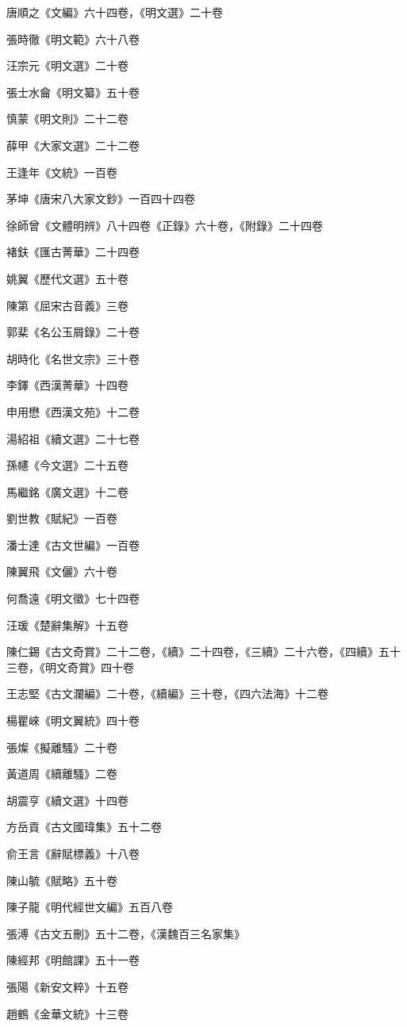 唐順之《文編》六十四卷，《明文選》二十卷

張時徹《明文範》六十八卷

汪宗元《明文選》二十卷

張士水龠《明文纂》五十卷

慎蒙《明文則》二十二卷

薛甲《大家文選》二十二卷

王逢年《文統》一百卷

茅坤《唐宋八大家文鈔》一百四十四卷

徐師曾《文體明辨》八十四卷《正錄》六十卷，《附錄》二十四卷

褚鈇《匯古菁華》二十四卷

姚翼《歷代文選》五十卷

陳第《屈宋古音義》三卷

郭棐《名公玉屑錄》二十卷

胡時化《名世文宗》三十卷

李鐸《西漢菁華》十四卷

申用懋《西漢文苑》十二卷

湯紹祖《續文選》二十七卷

孫幰《今文選》二十五卷

馬繼銘《廣文選》十二卷

劉世教《賦紀》一百卷

潘士達《古文世編》一百卷

陳翼飛《文儷》六十卷

何喬遠《明文徵》七十四卷

汪瑗《楚辭集解》十五卷

陳仁錫《古文奇賞》二十二卷，《續》二十四卷，《三續》二十六卷，《四續》五十三卷，《明文奇賞》四十卷

王志堅《古文瀾編》二十卷，《續編》三十卷，《四六法海》十二卷

楊瞿崍《明文翼統》四十卷

張燦《擬離騷》二十卷

黃道周《續離騷》二卷

胡震亨《續文選》十四卷

方岳貢《古文國瑋集》五十二卷

俞王言《辭賦標義》十八卷

陳山毓《賦略》五十卷

陳子龍《明代經世文編》五百八卷

張溥《古文五刪》五十二卷，《漢魏百三名家集》

陳經邦《明館課》五十一卷

張陽《新安文粹》十五卷

趙鶴《金華文統》十三卷

